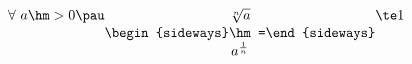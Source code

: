 
$\forall\  a\hm>0\pau \underset{\begin{matrix}\begin{sideways}\hm=\end{sideways}\\a^{\frac1n}\end{matrix}}{\sqrt[n]a}\te 1$
 